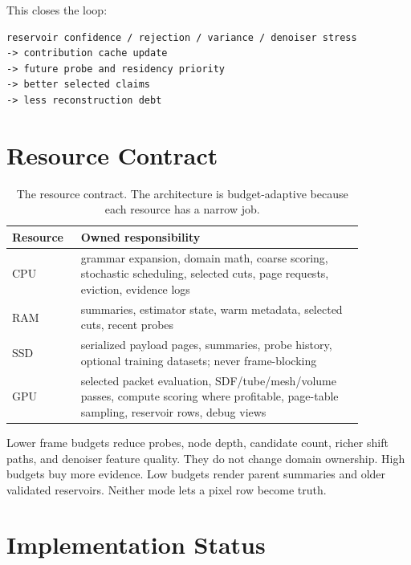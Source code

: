 \documentclass[11pt]{article}
\begin{document}
This closes the loop:

\begin{center}
\begin{minipage}{0.86\linewidth}
\small
\begin{verbatim}
reservoir confidence / rejection / variance / denoiser stress
-> contribution cache update
-> future probe and residency priority
-> better selected claims
-> less reconstruction debt
\end{verbatim}
\end{minipage}
\end{center}

\section{Resource Contract}

\begin{table}[h]
\centering
\begin{tabular}{p{0.15\linewidth}p{0.72\linewidth}}
\toprule
Resource & Owned responsibility \\
\midrule
CPU & grammar expansion, domain math, coarse scoring, stochastic scheduling,
selected cuts, page requests, eviction, evidence logs \\
RAM & summaries, estimator state, warm metadata, selected cuts, recent probes \\
SSD & serialized payload pages, summaries, probe history, optional training
datasets; never frame-blocking \\
GPU & selected packet evaluation, SDF/tube/mesh/volume passes, compute scoring
where profitable, page-table sampling, reservoir rows, debug views \\
\bottomrule
\end{tabular}
\caption{The resource contract.  The architecture is budget-adaptive because
each resource has a narrow job.}
\end{table}

Lower frame budgets reduce probes, node depth, candidate count, richer shift
paths, and denoiser feature quality.  They do not change domain ownership.
High budgets buy more evidence.  Low budgets render parent summaries and older
validated reservoirs.  Neither mode lets a pixel row become truth.

\section{Implementation Status}
\end{document}
